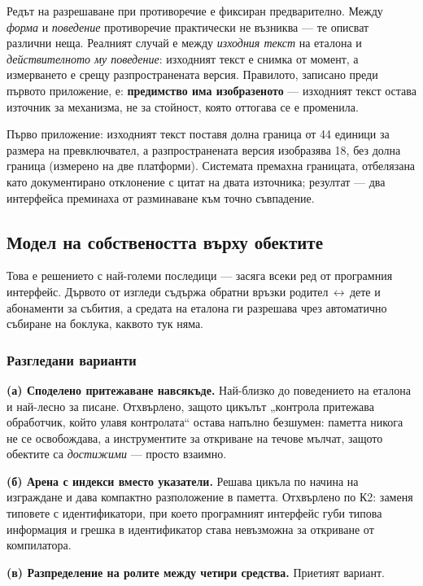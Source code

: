 Редът на разрешаване при противоречие е фиксиран предварително. Между \emph{форма} и
\emph{поведение} противоречие практически не възниква --- те описват различни неща.
Реалният случай е между \emph{изходния текст} на еталона и
\emph{действителното му поведение}: изходният текст е снимка от момент, а измерването е
срещу разпространената версия. Правилото, записано преди първото приложение, е:
\textbf{предимство има изобразеното} --- изходният текст остава източник за механизма, не
за стойност, която оттогава се е променила.

Първо приложение: изходният текст поставя долна граница от 44 единици за размера на
превключвател, а разпространената версия изобразява 18, без долна граница (измерено на две
платформи). Системата премахна границата, отбелязана като документирано отклонение с цитат
на двата източника; резултат --- два интерфейса преминаха от разминаване към точно
съвпадение.

\subsection{Модел на собствеността върху обектите}
\label{subsec:ownership}

Това е решението с най-големи последици --- засяга всеки ред от програмния интерфейс.
Дървото от изгледи съдържа обратни връзки родител\,$\leftrightarrow$\,дете и абонаменти за
събития, а средата на еталона ги разрешава чрез автоматично събиране на боклука, каквото тук
няма.

\subsubsection{Разгледани варианти}

\textbf{(а) Споделено притежаване навсякъде.} Най-близко до поведението на еталона и
най-лесно за писане. Отхвърлено, защото цикълът „контрола притежава обработчик, който
улавя контролата“ остава напълно безшумен: паметта никога не се освобождава, а
инструментите за откриване на течове мълчат, защото обектите са \emph{достижими} ---
просто взаимно.

\textbf{(б) Арена с индекси вместо указатели.} Решава цикъла по начина на изграждане и дава
компактно разположение в паметта. Отхвърлено по К2: заменя типовете с идентификатори, при
което програмният интерфейс губи типова информация и грешка в идентификатор става
невъзможна за откриване от компилатора.

\textbf{(в) Разпределение на ролите между четири средства.} Приетият вариант.

